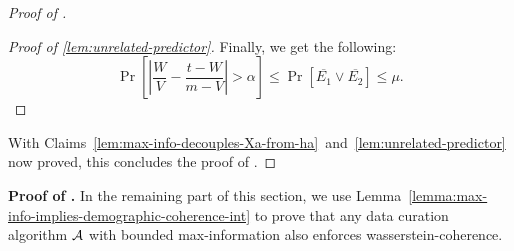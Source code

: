 \begin{proof}[Proof of ]
\begin{proof}[Proof of \cref{lem:unrelated-predictor}]
    
    Finally, we get the following:
    \[\Pr\left[\left|\frac{W}{V} - \frac{t - W}{m - V}\right| > \alpha\right]\leq \Pr[\overline{E_1}\lor\overline{E_2}]\leq \mu.\] 
\end{proof}

\noindent
With Claims~\ref{lem:max-info-decouples-Xa-from-ha}~and~\ref{lem:unrelated-predictor} now proved, this concludes the proof of .
\end{proof}

\smallskip\noindent\textbf{Proof of .}
In the remaining part of this section, we use Lemma~\ref{lemma:max-info-implies-demographic-coherence-int} to prove that any data curation algorithm $\mathcal{A}$ with bounded max-information also enforces wasserstein-coherence.

